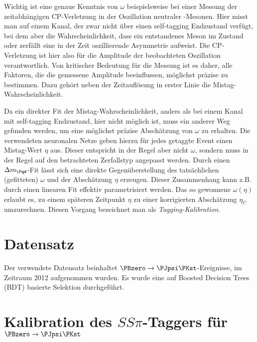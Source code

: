 Wichtig ist eine genaue Kenntnis von $ω$ beispielsweise bei einer Messung der zeitabhängigen CP-Verletzung in der Oszillation neutraler \PB-Mesonen.
Hier misst man auf einem Kanal, der zwar nicht über einen self-tagging Endzustand verfügt, bei dem aber die Wahrscheinlichkeit, dass ein entstandenes Meson im Zustand \PBz oder \PaBz zerfällt eine in der Zeit oszillierende Asymmetrie aufweist.
Die CP-Verletzung ist hier also für die Amplitude der beobachteten Oszillation verantwortlich.
Von kritischer Bedeutung für die Messung ist es daher, alle Faktoren, die die gemessene Amplitude beeinflussen, möglichst präzise zu bestimmen.
Dazu gehört neben der Zeitauflösung in erster Linie die Mistag-Wahrscheinlichkeit.

Da ein direkter Fit der Mistag-Wahrscheinlichkeit, anders als bei einem Kanal mit self-tagging Endzustand, hier nicht möglich ist, muss ein anderer Weg gefunden werden, um eine möglichst präzise Abschätzung von $ω$ zu erhalten.
Die verwendeten neuronalen Netze geben hierzu für jedes getaggte Event einen Mistag-Wert $η$ aus.
Dieser entspricht in der Regel aber nicht $ω$, sondern muss in der Regel auf den betrachteten Zerfallstyp angepasst werden.
Durch einen $\difference{m_{\Pqd}}$-Fit lässt sich eine direkte Gegenüberstellung des tatsächlichen (gefitteten) $ω$ und der Abschätzung $η$ erzeugen.
Dieser Zusammenhang kann z.B. durch einen linearen Fit effektiv parametrisiert werden.
Das so gewonnene $ω(η)$ erlaubt es, zu einem späteren Zeitpunkt $η$ zu einer korrigierten Abschätzung $η_C$ umzurechnen.
Diesen Vorgang bezeichnet man als \emph{Tagging-Kalibration}.



\section{Datensatz}
\label{datensatz}

Der verwendete Datensatz beinhaltet $\PBzero \to \PJpsi\PKst$-Ereignisse, im Zeitraum 2012 aufgenommen wurden.
Es wurde eine auf Boosted Decision Trees (BDT) basierte Selektion durchgeführt.

\section{\texorpdfstring{Kalibration des $SS\pi$-Taggers für $\PBzero \to \PJpsi \PKst$}{Kalibration des SSpi-Taggers für B0 -> JpsiKst}}

